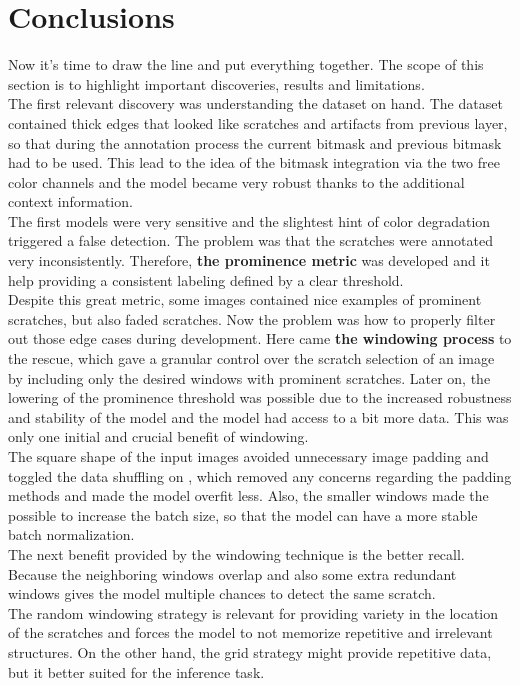 \section{Conclusions}
Now it's time to draw the line and put everything together. The scope of this section is to highlight important discoveries, results and limitations. \\
The first relevant discovery was understanding the dataset on hand. The dataset contained thick edges that looked like scratches and artifacts from previous layer, so that during the annotation process the current bitmask and previous bitmask had to be used. This lead to the idea of the bitmask integration via the two free color channels and the model became very robust thanks to the additional context information. \\
The first models were very sensitive and the slightest hint of color degradation triggered a false detection. The problem was that the scratches were annotated very inconsistently. Therefore, \textbf{the prominence metric} was developed and it help providing a consistent labeling defined by a clear threshold.\\
Despite this great metric, some images contained nice examples of prominent scratches, but also faded scratches. Now the problem was how to properly filter out those edge cases during development. Here came \textbf{the windowing process} to the rescue, which gave a granular control over the scratch selection of an image by including only the desired windows with prominent scratches. Later on, the lowering of the prominence threshold was possible due to the increased robustness and stability of the model and the model had access to a bit more data. This was only one initial and crucial benefit of windowing. \\
The square shape of the input images avoided unnecessary image padding and toggled the data shuffling on , which removed any concerns regarding the padding methods and made the model overfit less. Also, the smaller windows made the possible to increase the batch size, so that the model can have a more stable batch normalization. \\
The next benefit provided by the windowing technique is the better recall. Because the neighboring windows overlap and also some extra redundant windows gives the model multiple chances to detect the same scratch. \\
The random windowing strategy is relevant for providing variety in the location of the scratches and forces the model to not memorize repetitive and irrelevant structures. On the other hand, the grid strategy might provide repetitive data, but it better suited for the inference task. \\
